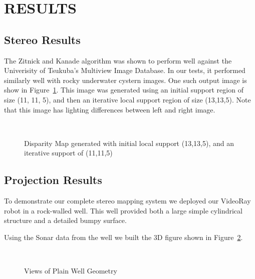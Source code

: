 \documentclass[a4paper,twoside]{article}
\begin{document}
\section{\uppercase{Results}}
\label{sec:results}

\subsection{Stereo Results}

The Zitnick and Kanade algorithm was shown to perform well against the Univerisity of Tsukuba's Multiview Image Database.  
In our tests, it performed similarly well with rocky underwater cystern images.  
One such output image is show in Figure~\ref{fig:disparity}.
This image was generated using an initial support region of size (11, 11, 5), and then an iterative local support region of size (13,13,5).
Note that this image has lighting differences between left and right image.

\begin{figure}[!h]
	\centering
		\quad %
		\\%
		\medskip
		\caption{Disparity Map generated with initial local support (13,13,5), and an iterative support of (11,11,5)}
		\label{fig:disparity}
\end{figure}

\subsection{Projection Results}
To demonstrate our complete stereo mapping system we deployed our VideoRay robot in a rock-walled well.
This well provided both a large simple cylindrical structure and a detailed bumpy surface.  

Using the Sonar data from the well we built the 3D figure shown in Figure~\ref{fig:result1}. 

\begin{figure}[!h]
	\centering
		\quad %
		\\%
		\caption{Views of Plain Well Geometry}
		\label{fig:result1}
\end{figure}
\end{document}
